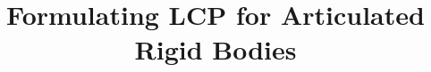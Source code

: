 \documentclass[12pt, letterpaper, onecolumn]{article}
\begin{document}
\title{Formulating LCP for Articulated Rigid Bodies}
\author{}
\date{}

\maketitle




\end{document}

